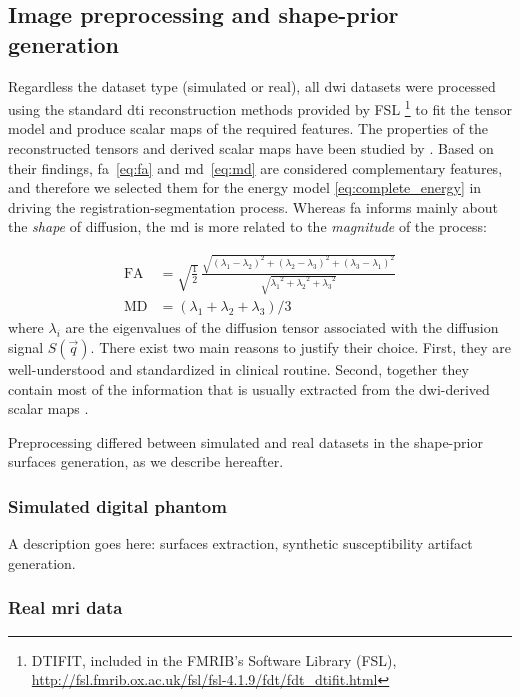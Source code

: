 \subsection{Image preprocessing and shape-prior generation}
\label{sec:preprocessing}
%
Regardless the dataset type (simulated or real), all \gls{dwi} datasets were processed
using the standard \gls{dti} reconstruction methods provided by FSL \footnote{DTIFIT, 
included in the FMRIB's Software Library (FSL), 
\url{http://fsl.fmrib.ox.ac.uk/fsl/fsl-4.1.9/fdt/fdt_dtifit.html}} to fit
the tensor model and produce scalar maps of the required features.
The properties of the reconstructed tensors and derived scalar maps have
been studied by \cite{ennis_orthogonal_2006}. Based on their
findings, \gls{fa}~\eqref{eq:fa} and \gls{md}~\eqref{eq:md} are
considered complementary features, and therefore we selected them for the 
energy model \eqref{eq:complete_energy} in driving the 
registration-segmentation process. 
Whereas \gls{fa} informs mainly about the \emph{shape} of diffusion, 
the \gls{md} is more related to the \emph{magnitude} of the process:

\begin{align}
\mathrm{FA} &= \sqrt{ \frac{1}{2}}\,\frac{\sqrt{ (\lambda_1 - \lambda_2)^2 + (\lambda_2 - \lambda_3)^2 + (\lambda_3 - \lambda_1)^2}}{\sqrt{ {\lambda_1}^2 + {\lambda_2}^2 + {\lambda_3}^2}} \label{eq:fa} \\
\mathrm{MD} &= ( \lambda_1 + \lambda_2 + \lambda_3 ) / 3 \label{eq:md}
\end{align}
where $\lambda_i$ are the eigenvalues of the diffusion tensor 
associated with the diffusion signal $S(\vec{q})$. There exist 
two main reasons to justify their choice. 
First, they are well-understood and standardized in clinical routine.
Second, together they contain most of the information that is
usually extracted from the \gls{dwi}-derived scalar maps
\cite{ennis_orthogonal_2006}.


Preprocessing differed between simulated and real datasets in the 
shape-prior surfaces generation, as we describe hereafter.


\subsubsection{Simulated digital phantom} %
A description goes here: surfaces extraction, synthetic susceptibility artifact generation.

\subsubsection {Real \gls{mri} data} %

